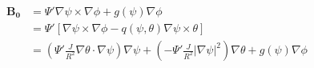 \documentclass[11pt,a4paper]{article}
\begin{document}
$$ 
\begin{aligned} 
\pmb{B_0} &= \Psi'\nabla\psi\times\nabla\phi + g(\psi)\nabla\phi \\ 
&= \Psi'[\nabla\psi\times\nabla\phi - q(\psi,\theta)\nabla\psi\times\theta] \\ 
&= (\Psi'\frac{J}{R^2}\nabla\theta\cdot\nabla\psi)\nabla\psi + (-\Psi'\frac{J}{R^2}|\nabla\psi|^2)\nabla\theta + g(\psi)\nabla\phi \end{aligned} 
$$
%
%
%
%
%	
%	
%	
\end{document}

